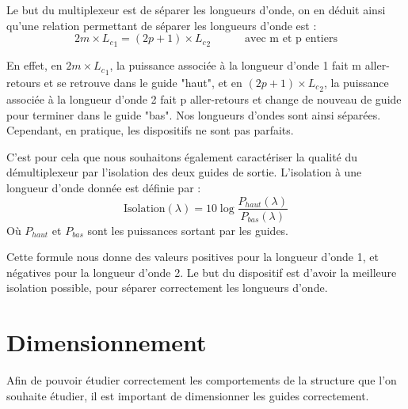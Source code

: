 \documentclass[a4paper,11pt]{report}
\begin{document}
Le but du multiplexeur est de séparer les longueurs d'onde, on en déduit ainsi qu'une relation permettant de séparer les longueurs d'onde est :
\begin{equation}
    2m\times{L_c}_1=(2p+1)\times{L_c}_2\,\,\hspace{1cm}\text{   avec m et p entiers}
\end{equation}

En effet, en $2m\times{L_c}_1$, la puissance associée à la longueur d'onde 1 fait m aller-retours et se retrouve dans le guide "haut", et en $(2p+1)\times{L_c}_2$, la puissance associée à la longueur d'onde 2 fait p aller-retours et change de nouveau de guide pour terminer dans le guide "bas". Nos longueurs d'ondes sont ainsi séparées. Cependant, en pratique, les dispositifs ne sont pas parfaits. 


%
%
C'est pour cela que nous souhaitons également caractériser la qualité du démultiplexeur par l'isolation des deux guides de sortie.
L'isolation à une longueur d'onde donnée est définie par :
\[
    \text{Isolation}(\lambda) = 10 \log\frac{P_{haut}(\lambda)}{P_{bas}(\lambda)}
\]
Où $P_{haut}$ et $P_{bas}$ sont les puissances sortant par les guides.

Cette formule nous donne des valeurs positives pour la longueur d'onde 1, et négatives pour la longueur d'onde 2. Le but du dispositif est d'avoir la meilleure isolation possible, pour séparer correctement les longueurs d'onde.

\chapter{Dimensionnement}
Afin de pouvoir étudier correctement les comportements de la structure que l'on souhaite étudier, il est important de dimensionner les guides correctement.
\end{document}
